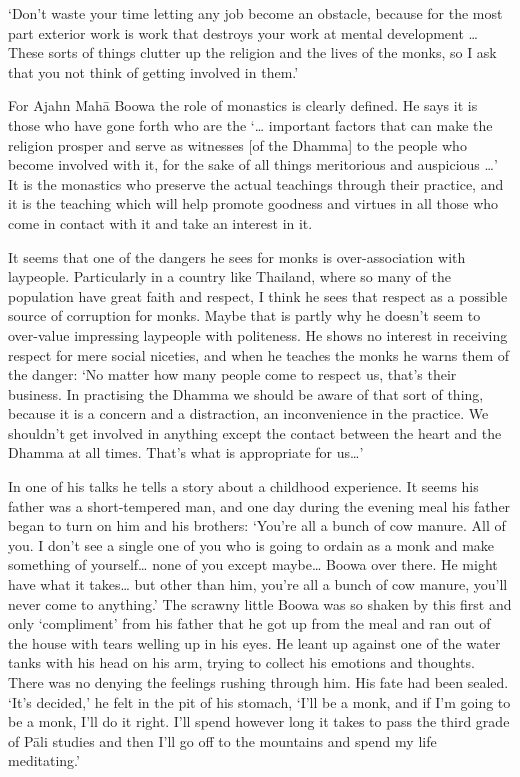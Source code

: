 `Don't waste your time letting any job become an obstacle, because for
the most part exterior work is work that destroys your work at mental
development \ldots{} These sorts of things clutter up the religion and
the lives of the monks, so I ask that you not think of getting involved
in them.'

For Ajahn Mahā Boowa the role of monastics is clearly defined. He says
it is those who have gone forth who are the `\ldots{} important factors
that can make the religion prosper and serve as witnesses [of the
Dhamma] to the people who become involved with it, for the sake of all
things meritorious and auspicious \ldots{}' It is the monastics who
preserve the actual teachings through their practice, and it is the
teaching which will help promote goodness and virtues in all those who
come in contact with it and take an interest in it. 

It seems that one of the dangers he sees for monks is over-association
with laypeople. Particularly in a country like Thailand, where so many
of the population have great faith and respect, I think he sees that
respect as a possible source of corruption for monks. Maybe that is
partly why he doesn't seem to over-value impressing laypeople with
politeness. He shows no interest in receiving respect for mere social
niceties, and when he teaches the monks he warns them of the danger: `No
matter how many people come to respect us, that's their business. In
practising the Dhamma we should be aware of that sort of thing, because
it is a concern and a distraction, an inconvenience in the practice. We
shouldn't get involved in anything except the contact between the heart
and the Dhamma at all times. That's what is appropriate for us\ldots{}'

In one of his talks he tells a story about a childhood experience. It
seems his father was a short-tempered man, and one day during the
evening meal his father began to turn on him and his brothers: `You're
all a bunch of cow manure. All of you. I don't see a single one of you
who is going to ordain as a monk and make something of yourself\ldots{}
none of you except maybe\ldots{} Boowa over there. He might have what
it takes\ldots{} but other than him, you're all a bunch of cow manure, 
you'll never come to anything.' The scrawny little Boowa was so shaken
by this first and only `compliment' from his father that he got up from
the meal and ran out of the house with tears welling up in his eyes. He
leant up against one of the water tanks with his head on his arm, trying
to collect his emotions and thoughts. There was no denying the feelings
rushing through him. His fate had been sealed. `It's decided,' he felt
in the pit of his stomach, `I'll be a monk, and if I'm going to be a
monk, I'll do it right. I'll spend however long it takes to pass the
third grade of Pāli studies and then I'll go off to the mountains and
spend my life meditating.'

